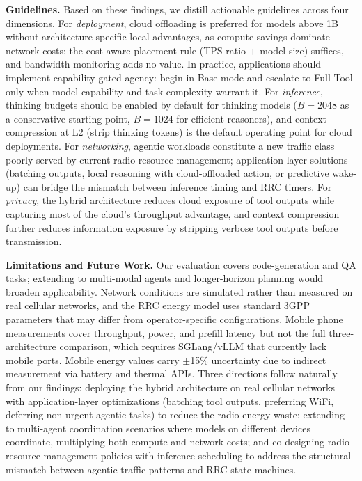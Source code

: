 \documentclass[sigconf,anonymous,review]{acmart}
\begin{document}
\noindent \textbf{Guidelines.} Based on these findings, we distill actionable guidelines across four dimensions. For \emph{deployment}, cloud offloading is preferred for models above 1B without architecture-specific local advantages, as compute savings dominate network costs; the cost-aware placement rule (TPS ratio + model size) suffices, and bandwidth monitoring adds no value. In practice, applications should implement capability-gated agency: begin in Base mode and escalate to Full-Tool only when model capability and task complexity warrant it. For \emph{inference}, thinking budgets should be enabled by default for thinking models ($B{=}2048$ as a conservative starting point, $B{=}1024$ for efficient reasoners), and context compression at L2 (strip thinking tokens) is the default operating point for cloud deployments. For \emph{networking}, agentic workloads constitute a new traffic class poorly served by current radio resource management; application-layer solutions (batching outputs, local reasoning with cloud-offloaded action, or predictive wake-up) can bridge the mismatch between inference timing and RRC timers. For \emph{privacy}, the hybrid architecture reduces cloud exposure of tool outputs while capturing most of the cloud's throughput advantage, and context compression further reduces information exposure by stripping verbose tool outputs before transmission.

\noindent \textbf{Limitations and Future Work.}
Our evaluation covers code-generation and QA tasks; extending to multi-modal agents and longer-horizon planning would broaden applicability. Network conditions are simulated rather than measured on real cellular networks, and the RRC energy model uses standard 3GPP parameters that may differ from operator-specific configurations. Mobile phone measurements cover throughput, power, and prefill latency but not the full three-architecture comparison, which requires SGLang/vLLM that currently lack mobile ports. Mobile energy values carry $\pm$15\% uncertainty due to indirect measurement via battery and thermal APIs. Three directions follow naturally from our findings: deploying the hybrid architecture on real cellular networks with application-layer optimizations (batching tool outputs, preferring WiFi, deferring non-urgent agentic tasks) to reduce the radio energy waste; extending to multi-agent coordination scenarios where models on different devices coordinate, multiplying both compute and network costs; and co-designing radio resource management policies with inference scheduling to address the structural mismatch between agentic traffic patterns and RRC state machines.



\end{document}
